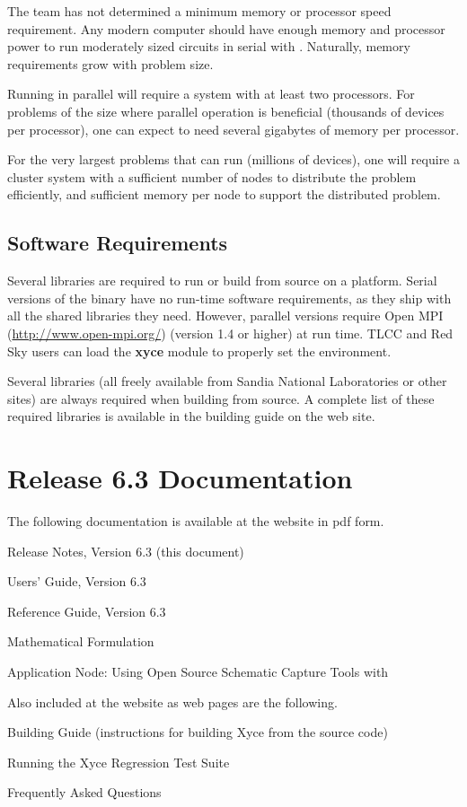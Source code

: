 \documentclass[11pt,report,strict]{SANDreport}
\begin{document}
The \Xyce{} team has not determined a minimum memory or processor
speed requirement.  Any modern computer should have enough memory and
processor power to run moderately sized circuits in serial with
\Xyce{}.  Naturally, memory requirements grow with problem size.  

Running \Xyce{} in parallel will require a system with at least two
processors. For problems of the size where parallel operation is
beneficial (thousands of devices per processor), one can expect to
need several gigabytes of memory per processor. 

For the very largest problems that \Xyce{} can run (millions of
devices), one will require a cluster system with a sufficient number
of nodes to distribute the problem efficiently, and sufficient memory
per node to support the distributed problem.  

\subsection{Software Requirements}
Several libraries are required to run \Xyce{} or build \Xyce{} from source on a
platform.  Serial versions of the \Xyce{} binary have no run-time software
requirements, as they ship with all the shared libraries they need.  However,
parallel versions require Open MPI
({\color{XyceDeepRed}\url{http://www.open-mpi.org/}}) (version 1.4 or higher)
at run time.  TLCC and Red Sky users can load the \textbf{xyce} module to properly
set the environment. 

Several libraries (all freely available from Sandia National
Laboratories or other sites) are always required when building \Xyce{}
from source.  A complete list of these required libraries is available
in the building guide on the \Xyce{} web site.

\section{\Xyce{} Release 6.3 Documentation}
The following \Xyce{} documentation is available at the \Xyce{} website in pdf
form.
\begin{XyceItemize}
\item \Xyce{} Release Notes, Version 6.3 (this document)
\item \Xyce{} Users' Guide, Version 6.3
\item \Xyce{} Reference Guide, Version 6.3
\item \Xyce{} Mathematical Formulation
\item Application Node: Using Open Source Schematic Capture Tools with \Xyce{}
\end{XyceItemize}
Also included at the \Xyce{} website as web pages are the following.
\begin{XyceItemize}
\item Building Guide (instructions for building Xyce from the source code)
\item Running the Xyce Regression Test Suite
\item Frequently Asked Questions
\end{XyceItemize}
\end{document}

